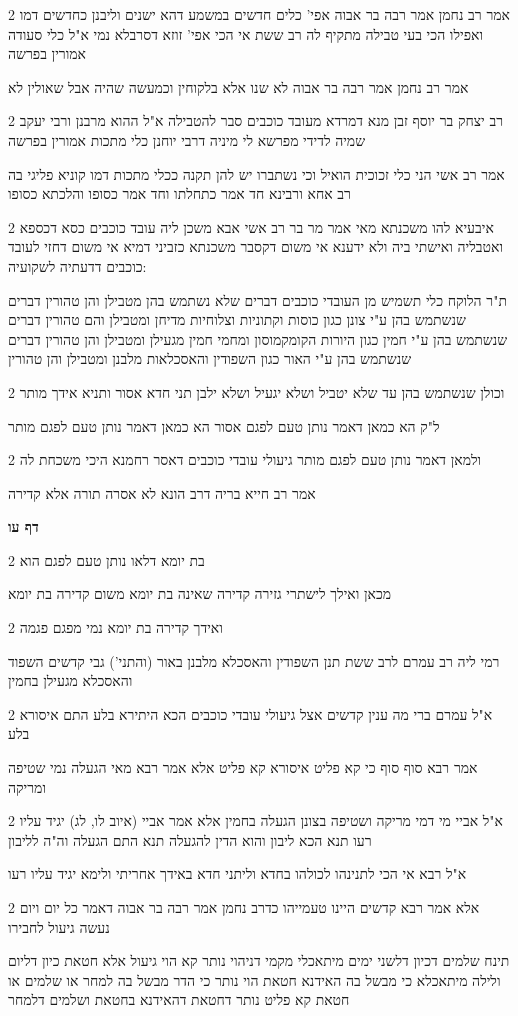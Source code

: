 \documentclass[12pt, openany]{book}
\newcommand{\sethebfont}{
\fontsize{10.5pt}{21.0pt} \selectfont
}
\newcommand{\twocol}[1]{
	{\sethebfont \begin{multicols}{2}
			#1
	\end{multicols}}	
}
\newcommand{\sectname}{}
\newcommand{\newsection}[1]{
	\addcontentsline{toc}{section}{#1}
	\renewcommand{\sectname}{#1}	
	\vspace{-\baselineskip}
	\begin{center}
		\textbf{%
\fontsize{16pt}{16pt}\selectfont
			#1}
	\end{center}
	\vspace{-\baselineskip}
	\nopagebreak
}
\begin{document}
\twocol{אמר רב נחמן אמר רבה בר אבוה אפי' כלים חדשים במשמע דהא ישנים וליבנן כחדשים דמו ואפילו הכי בעי טבילה מתקיף לה רב ששת אי הכי אפי' זוזא דסרבלא נמי א"ל כלי סעודה אמורין בפרשה
\par אמר רב נחמן אמר רבה בר אבוה לא שנו אלא בלקוחין וכמעשה שהיה אבל שאולין לא}
\twocol{רב יצחק בר יוסף זבן מנא דמרדא מעובד כוכבים סבר להטבילה א"ל ההוא מרבנן ורבי יעקב שמיה לדידי מפרשא לי מיניה דרבי יוחנן כלי מתכות אמורין בפרשה
\par אמר רב אשי הני כלי זכוכית הואיל וכי נשתברו יש להן תקנה ככלי מתכות דמו קוניא פליגי בה רב אחא ורבינא חד אמר כתחלתו וחד אמר כסופו והלכתא כסופו}
\twocol{איבעיא להו משכנתא מאי אמר מר בר רב אשי אבא משכן ליה עובד כוכבים כסא דכספא ואטבליה ואישתי ביה ולא ידענא אי משום דקסבר משכנתא כזביני דמיא אי משום דחזי לעובד כוכבים דדעתיה לשקועיה:
\par ת"ר הלוקח כלי תשמיש מן העובדי כוכבים דברים שלא נשתמש בהן מטבילן והן טהורין דברים שנשתמש בהן ע"י צונן כגון כוסות וקתוניות וצלוחיות מדיחן ומטבילן והם טהורין דברים שנשתמש בהן ע"י חמין כגון היורות הקומקמוסון ומחמי חמין מגעילן ומטבילן והן טהורין דברים שנשתמש בהן ע"י האור כגון השפודין והאסכלאות מלבנן ומטבילן והן טהורין}
\twocol{וכולן שנשתמש בהן עד שלא יטביל ושלא יגעיל ושלא ילבן תני חדא אסור ותניא אידך מותר
\par ל"ק הא כמאן דאמר נותן טעם לפגם אסור הא כמאן דאמר נותן טעם לפגם מותר}
\twocol{ולמאן דאמר נותן טעם לפגם מותר גיעולי עובדי כוכבים דאסר רחמנא היכי משכחת לה
\par אמר רב חייא בריה דרב הונא לא אסרה תורה אלא קדירה}
\newsection{דף עו}
\twocol{בת יומא דלאו נותן טעם לפגם הוא
\par מכאן ואילך לישתרי גזירה קדירה שאינה בת יומא משום קדירה בת יומא}
\twocol{ואידך קדירה בת יומא נמי מפגם פגמה
\par רמי ליה רב עמרם לרב ששת תנן השפודין והאסכלא מלבנן באור (והתני') גבי קדשים השפוד והאסכלא מגעילן בחמין}
\twocol{א"ל עמרם ברי מה ענין קדשים אצל גיעולי עובדי כוכבים הכא היתירא בלע התם איסורא בלע
\par אמר רבא סוף סוף כי קא פליט איסורא קא פליט אלא אמר רבא מאי הגעלה נמי שטיפה ומריקה}
\twocol{א"ל אביי מי דמי מריקה ושטיפה בצונן הגעלה בחמין אלא אמר אביי (איוב לו, לג) יגיד עליו רעו תנא הכא ליבון והוא הדין להגעלה תנא התם הגעלה וה"ה לליבון
\par א"ל רבא אי הכי לתנינהו לכולהו בחדא וליתני חדא באידך אחריתי ולימא יגיד עליו רעו}
\twocol{אלא אמר רבא קדשים היינו טעמייהו כדרב נחמן אמר רבה בר אבוה דאמר כל יום ויום נעשה גיעול לחבירו
\par תינח שלמים דכיון דלשני ימים מיתאכלי מקמי דניהוי נותר קא הוי גיעול אלא חטאת כיון דליום ולילה מיתאכלא כי מבשל בה האידנא חטאת הוי נותר כי הדר מבשל בה למחר או שלמים או חטאת קא פליט נותר דחטאת דהאידנא בחטאת ושלמים דלמחר}
\end{document}
